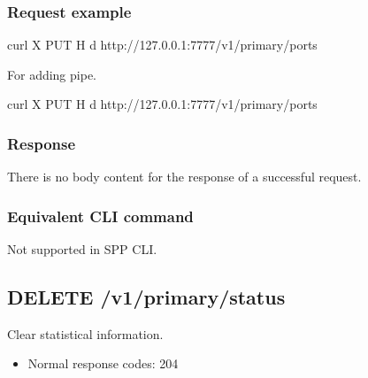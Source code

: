 \documentclass[a4paper,11pt,openany,oneside,english]{sphinxmanual}
\begin{document}
\subsubsection{Request example}
\label{\detokenize{api_ref/spp_primary:id3}}
\begin{sphinxVerbatim}[commandchars=\\\{\},formatcom=\footnotesize]
 curl \PYGZhy{}X PUT \PYGZhy{}H  
  \PYGZhy{}d  
  http://127.0.0.1:7777/v1/primary/ports
\end{sphinxVerbatim}

For adding pipe.

\begin{sphinxVerbatim}[commandchars=\\\{\},formatcom=\footnotesize]
 curl \PYGZhy{}X PUT \PYGZhy{}H  
  \PYGZhy{}d 
 
  http://127.0.0.1:7777/v1/primary/ports
\end{sphinxVerbatim}


\subsubsection{Response}
\label{\detokenize{api_ref/spp_primary:id4}}
There is no body content for the response of a successful  request.


\subsubsection{Equivalent CLI command}
\label{\detokenize{api_ref/spp_primary:id5}}
Not supported in SPP CLI.


\subsection{DELETE /v1/primary/status}
\label{\detokenize{api_ref/spp_primary:delete-v1-primary-status}}
Clear statistical information.
\begin{itemize}
\item {} 
Normal response codes: 204

\end{itemize}
\end{document}
